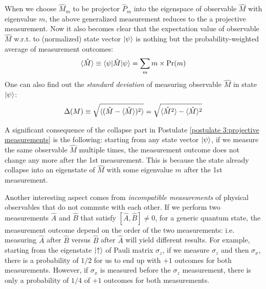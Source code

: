When we choose $\hat M_m$ to be projector $\hat P_m$ into the eigenspace of observable $\hat M$ with eigenvalue $m$, the above generalized measurement reduces to the a projective measurement. Now it also becomes clear that the expectation value of observable $\hat M$ w.r.t. to (normalized) state vector $|{\psi}\rangle$ is nothing but the probability-weighted average of measurement outcomes:
\begin{align}
\langle{\hat M}\rangle\equiv\langle{\psi|\hat M|\psi}\rangle=\sum_m m\times \text{Pr}(m)
\end{align}
One can also find out the \emph{standard deviation} of measuring observable $\hat M$ in state $|{\psi}\rangle$:
\begin{align}
\Delta(M)\equiv\sqrt{\langle{(\hat M-\langle{\hat M}\rangle)^2}\rangle}=\sqrt{\langle{\hat M^2}\rangle-\langle{\hat M}\rangle^2}
\end{align}

A significant consequence of the collapse part in Postulate \ref{postulate 3:projective measurements} is the following: starting from any state vector $|{\psi}\rangle$, if we measure the same observable $\hat M$ multiple times, the measurement outcome does not change any more after the 1st measurement. This is because the state already collapse into an eigenstate of $\hat M$ with some eigenvalue $m$ after the 1st measurement.

Another interesting aspect comes from \emph{incompatible measurements} of physical observables that do not commute with each other. If we perform two measurements $\hat A$ and $\hat B$ that satisfy $[\hat A,\hat B]\neq0$, for a generic quantum state, the measurement outcome depend on the order of the two measurements: i.e. measuring $\hat A$ after $\hat B$ versus $\hat B$ after $\hat A$ will yield different results. For example, starting from the eigenstate $|{\uparrow}\rangle$ of Pauli matrix $\sigma_z$, if we measure $\sigma_z$ and then $\sigma_x$, there is a probability of $1/2$ for us to end up with $+1$ outcomes for both measurements. However, if $\sigma_x$ is measured before the $\sigma_z$ measurement, there is only a probability of $1/4$ of $+1$ outcomes for both measurements.